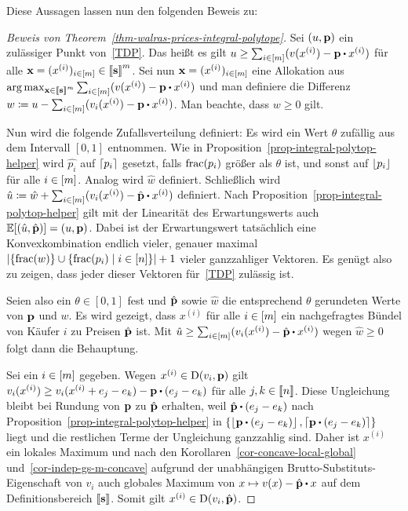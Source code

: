 Diese Aussagen lassen nun den folgenden Beweis zu:
\begin{proof}[Beweis von Theorem~\ref{thm-walras-prices-integral-polytope}]
	Sei $(u, \mathbf{p})$ ein zulässiger Punkt von~\eqref{TDP}.
	Das heißt es gilt $u \geq \sum_{i\in\first{m}} ( v(x^{(i)}) - \fp \bcdot x^{(i)})$ für alle $\mathbf{x} = (x^{(i)})_{i\in\left[ m \right]}\in\left\llbracket \mathbf{s} \right\rrbracket^m$.
	Sei nun $\mathbf{x} = (x^{(i)})_{i\in\left[ m \right]}$ eine Allokation aus $\arg\max_{\fx\in\ffirst{\fs}^m} \sum_{i\in\first{m}} (v(x^{(i)}) - \fp \bcdot x^{(i)})$ und man definiere die Differenz $w \coloneqq u - \sum_{i\in\first{m}} (v_i(x^{(i)}) - \fp \bcdot x^{(i)})$.
	Man beachte, dass $w \geq 0$ gilt.
	
	Nun wird die folgende Zufallsverteilung definiert:
	Es wird ein Wert $\theta$ zufällig aus dem Intervall $[0,1]$ entnommen.
	Wie in Proposition~\ref{prop-integral-polytop-helper} wird $\hat{p_i}$ auf $\left\lceil p_i \right\rceil$ gesetzt, falls $\operatorname{frac}(p_i)$ größer als $\theta$ ist, und sonst auf $\left\lfloor p_i \right\rfloor$ für alle $i\in\left[ m \right]$.
	Analog wird $\hat{w}$ definiert.
	Schließlich wird $\hat{u}\coloneqq\hat{w}+ \sum_{i\in\first{m}} (v_i(x^{(i)}) - \hat{\fp} \bcdot x^{(i)})$ definiert.
	Nach Proposition~\ref{prop-integral-polytop-helper} gilt mit der Linearität des Erwartungswerts auch $\mathbb{E}[(\hat{u},\hat{\mathbf{p}})] = (u, \mathbf{p})$.
	Dabei ist der Erwartungswert tatsächlich eine Konvexkombination endlich vieler, genauer maximal $\left\lvert  \{ \operatorname{frac}(w) \} \cup \{ \operatorname{frac}(p_i) \mid i\in\left[ n \right] \}  \right\rvert + 1$ vieler ganzzahliger Vektoren.
	Es genügt also zu zeigen, dass jeder dieser Vektoren für~\eqref{TDP} zulässig ist.
	
	Seien also ein $\theta\in [0,1]$ fest und $\hat{\mathbf{p}}$ sowie $\hat{w}$ die entsprechend $\theta$ gerundeten Werte von $\mathbf{p}$ und $w$.
	Es wird gezeigt, dass $x^{(i)}$ für alle $i\in\left[ m \right]$ ein nachgefragtes Bündel von Käufer $i$ zu Preisen $\hat{\mathbf{p}}$ ist.
	Mit $\hat{u}\geq \sum_{i\in\first{m}}(v_i(x^{(i)}) - \hat{\fp}\bcdot x^{(i)})$ wegen $\hat{w}\geq0$ folgt dann die Behauptung.
	
	Sei ein $i\in\left[ m \right]$ gegeben. Wegen $x^{(i)}\in\operatorname{D}(v_i, \mathbf{p})$ gilt $v_i(x^{(i)}) \geq v_i(x^{(i)} + e_j - e_k) - \fp \bcdot (e_j - e_k)$ für alle $j,k\in\left\llbracket n \right\rrbracket$.
	Diese Ungleichung bleibt bei Rundung von $\mathbf{p}$ zu $\hat{\mathbf{p}}$ erhalten, weil $\hat{\fp}\bcdot (e_j - e_k)$ nach Proposition~\ref{prop-integral-polytop-helper} in $\{ \floor{\fp\bcdot(e_j - e_k)}, \ceil{\fp\bcdot(e_j - e_k)} \}$ liegt und die rest\-lichen Terme der Ungleichung ganzzahlig sind.
	Daher ist $x^{(i)}$ ein lokales Maximum und nach den Korollaren~\ref{cor-concave-local-global} und~\ref{cor-indep-gs-m-concave} aufgrund der unabhängigen Brutto-Substituts-Eigenschaft von $v_i$ auch globales Maximum von $x\mapsto v(x) - \hat{\fp} \bcdot x$ auf dem Definitionsbereich $\left\llbracket \mathbf{s} \right\rrbracket$.
	Somit gilt $x^{(i)}\in\operatorname{D}(v_i, \hat{\mathbf{p}})$.
\end{proof}